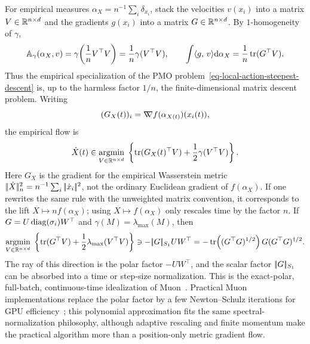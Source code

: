 \begin{rem}
For empirical measures $\alpha_X=n^{-1}\sum_i\delta_{x_i}$, stack the velocities $v(x_i)$ into a matrix $V\in\mathbb{R}^{n\times d}$ and the gradients $g(x_i)$ into a matrix $G\in\mathbb{R}^{n\times d}$. By $1$-homogeneity of $\gamma$,
\[
	\mathbb A_\gamma(\alpha_X,v)
	=
	\gamma\!\left(\frac1n V^\top V\right)
	=
	\frac1n\gamma(V^\top V),
	\qquad
	\int\langle g,\,v\rangle\mathrm{d}\alpha_X
	=
	\frac1n\operatorname{tr}(G^\top V).
\]
Thus the empirical specialization of the PMO problem~\eqref{eq-local-action-steepest-descent} is, up to the harmless factor $1/n$, the finite-dimensional matrix descent problem. Writing
\[
	(G_X(t))_i=\mathord{\nabla\mkern-9.3mu\nabla} f(\alpha_{X(t)})(x_i(t)),
\]
the empirical flow is
\begin{equation}\label{eq-normalized-matrix-descent}
	\dot X(t)
	\in
	\underset{V\in\mathbb{R}^{n\times d}}{\operatorname{argmin}}\;
	\left\{
		\operatorname{tr}(G_X(t)^\top V)+\frac12\gamma(V^\top V)
	\right\}.
\end{equation}
Here $G_X$ is the gradient for the empirical Wasserstein metric $|\!| \dot X |\!|_n^2=n^{-1}\sum_i|\!| \dot x_i |\!|^2$, not the ordinary Euclidean gradient of $f(\alpha_X)$. If one rewrites the same rule with the unweighted matrix convention, it corresponds to the lift $X\mapsto n f(\alpha_X)$; using $X\mapsto f(\alpha_X)$ only rescales time by the factor $n$.
If $G=U\operatorname{diag}(\sigma_i)W^\top$ and $\gamma(M)=\lambda_{\max}(M)$, then
\begin{equation}\label{eq-normalized-muon-direction}
	\underset{V\in\mathbb{R}^{n\times d}}{\operatorname{argmin}}\;
	\left\{
		\operatorname{tr}(G^\top V)+\frac12\lambda_{\max}(V^\top V)
	\right\}
	\ni
	-|\!| G |\!|_{S_1}UW^\top
	=
	-\operatorname{tr}\!\left((G^\top G)^{1/2}\right)G(G^\top G)^{\dagger/2}.
\end{equation}
The ray of this direction is the polar factor $-UW^\top$, and the scalar factor $|\!| G |\!|_{S_1}$ can be absorbed into a time or step-size normalization. This is the exact-polar, full-batch, continuous-time idealization of Muon~\cite{KellerJordan2024,peyre2026muon}. Practical Muon implementations replace the polar factor by a few Newton--Schulz iterations for GPU efficiency~\cite{LiuSuYaoEtAl2025}; this polynomial approximation fits the same spectral-normalization philosophy, although adaptive rescaling and finite momentum make the practical algorithm more than a position-only metric gradient flow.
\end{rem}


